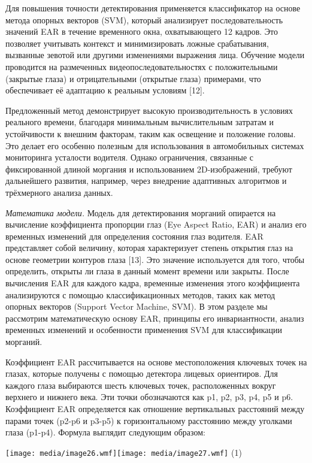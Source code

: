\documentclass[
]{article}
\begin{document}
Для повышения точности детектирования применяется классификатор на
основе метода опорных векторов (SVM), который анализирует
последовательность значений EAR в течение временного окна, охватывающего
12 кадров. Это позволяет учитывать контекст и минимизировать ложные
срабатывания, вызванные зевотой или другими изменениями выражения лица.
Обучение модели проводится на размеченных видеопоследовательностях с
положительными (закрытые глаза) и отрицательными (открытые глаза)
примерами, что обеспечивает её адаптацию к реальным условиям {[}12{]}.

Предложенный метод демонстрирует высокую производительность в условиях
реального времени, благодаря минимальным вычислительным затратам и
устойчивости к внешним факторам, таким как освещение и положение головы.
Это делает его особенно полезным для использования в автомобильных
системах мониторинга усталости водителя. Однако ограничения, связанные с
фиксированной длиной моргания и использованием 2D-изображений, требуют
дальнейшего развития, например, через внедрение адаптивных алгоритмов и
трёхмерного анализа данных.

\emph{Математика модели.} Модель для детектирования морганий опирается
на вычисление коэффициента пропорции глаз (Eye Aspect Ratio, EAR) и
анализ его временных изменений для определения состояния глаз водителя.
EAR представляет собой величину, которая характеризует степень открытия
глаз на основе геометрии контуров глаза {[}13{]}. Это значение
используется для того, чтобы определить, открыты ли глаза в данный
момент времени или закрыты. После вычисления EAR для каждого кадра,
временные изменения этого коэффициента анализируются с помощью
классификационных методов, таких как метод опорных векторов (Support
Vector Machine, SVM). В этом разделе мы рассмотрим математическую основу
EAR, принципы его инвариантности, анализ временных изменений и
особенности применения SVM для классификации морганий.

Коэффициент EAR рассчитывается на основе местоположения ключевых точек
на глазах, которые получены с помощью детектора лицевых ориентиров. Для
каждого глаза выбираются шесть ключевых точек, расположенных вокруг
верхнего и нижнего века. Эти точки обозначаются как p1, p2, p3, p4, p5 и
p6. Коэффициент EAR определяется как отношение вертикальных расстояний
между парами точек (p2-p6 и p3-p5) к горизонтальному расстоянию между
уголками глаза (p1-p4). Формула выглядит следующим образом:

\texttt{[image: media/image26.wmf]}\texttt{[image: media/image27.wmf]}
(1)
\end{document}
